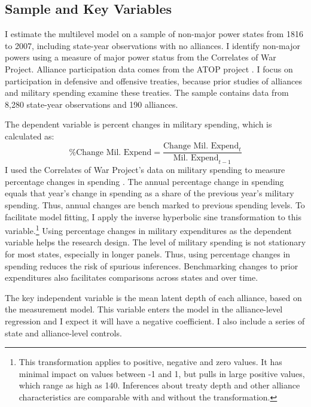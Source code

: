 \documentclass[12pt]{article}
\begin{document}
\subsection{Sample and Key Variables} 

I estimate the multilevel model on a sample of non-major power states from 1816 to 2007, including state-year observations with no alliances. 
I identify non-major powers using a measure of major power status from the Correlates of War Project. 
Alliance participation data comes from the ATOP project \citep{Leedsetal2002}.  
I focus on participation in defensive and offensive treaties, because prior studies of alliances and military spending examine these treaties. 
The sample contains data from 8,280 state-year observations and 190 alliances. 


The dependent variable is percent changes in military spending, which is calculated as:
\begin{equation}
\mbox{\% Change Mil. Expend} = \frac{ \mbox{Change Mil. Expend}_t }{ \mbox{Mil. Expend}_{t-1} }
\end{equation} 
I used the Correlates of War Project's data on military spending to measure percentage changes in spending \citep{SingerCINC1988}.%
The annual percentage change in spending equals that year's change in spending as a share of the previous year's military spending.
Thus, annual changes are bench marked to previous spending levels. 
To facilitate model fitting, I apply the inverse hyperbolic sine transformation to this variable.\footnote{This transformation applies to positive, negative and zero values. It has minimal impact on values between -1 and 1, but pulls in large positive values, which range as high as 140. Inferences about treaty depth and other alliance characteristics are comparable with and without the transformation.}
Using percentage changes in military expenditures as the dependent variable helps the research design. 
The level of military spending is not stationary for most states, especially in longer panels. 
Thus, using percentage changes in spending reduces the risk of spurious inferences.
Benchmarking changes to prior expenditures also facilitates comparisons across states and over time. 


The key independent variable is the mean latent depth of each alliance, based on the measurement model. 
This variable enters the model in the alliance-level regression and I expect it will have a negative coefficient. 
I also include a series of state and alliance-level controls.
\end{document}
